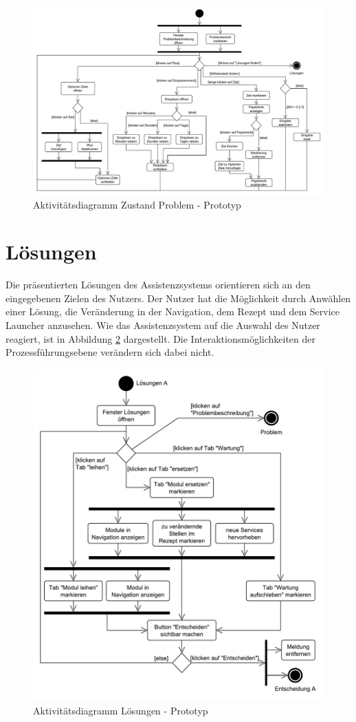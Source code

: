 \begin{figure}[tbp]
\centering
\includegraphics[angle=90,scale=0.5]{DA_files/UML/Prototyp/Aktivitaetsdiagramm-Problem.pdf}
\caption{Aktivitätsdiagramm Zustand Problem - Prototyp}
\label{pic:Aktivitaetsdiagramm-Problem}
\end{figure}

\section{Lösungen}
\label{5:Loesungen}
Die präsentierten Lösungen des Assistenzsystems orientieren sich an den eingegebenen Zielen des Nutzers. Der Nutzer hat die Möglichkeit durch Anwählen einer Lösung, die Veränderung in der Navigation, dem Rezept und dem Service Launcher anzusehen. Wie das Assistenzsystem auf die Auswahl des Nutzer reagiert, ist in Abbildung \ref{pic:Aktivitaetsdiagramm-Loesungen} dargestellt. Die Interaktionsmöglichkeiten der Prozessführungsebene verändern sich dabei nicht.

\begin{figure}[h!]
\centering
\includegraphics[scale=0.56]{DA_files/UML/Prototyp/Aktivitaetsdiagramm-Loesungen.pdf}
\caption{Aktivitätsdiagramm Lösungen - Prototyp}
\label{pic:Aktivitaetsdiagramm-Loesungen}
\end{figure}